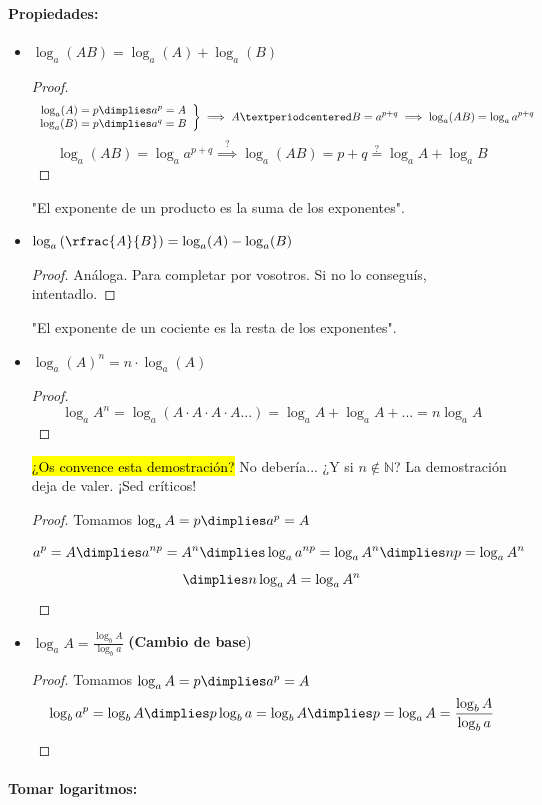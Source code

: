 \paragraph{Propiedades:}
\begin{itemize}
	\item $\log_a(AB) = \log_a(A) + \log_a(B)$
		\begin{proof}
			\[\left.\begin{array}{c}
				\log_a(A) = p \dimplies a^p = A\\
				\log_a(B) = p \dimplies a^q = B
			\end{array}\right\}\implies A·B = a^{p+q} \implies \log_a(AB) = \log_aa^{p+q}\]
			\[
				\log_a(AB) = \log_aa^{p+q} \overset{?}{\implies} \log_a(AB) = p+q \overset{?}{=} \log_aA + \log_aB
			\]
		\end{proof}
		\subitem "El exponente de un producto es la suma de los exponentes".
	\item $\log_a\left(\rfrac{A}{B}\right) = \log_a(A) - \log_a(B)$
	\begin{proof}
		Análoga. Para completar por vosotros. Si no lo conseguís, intentadlo.
	\end{proof}
	\subitem "El exponente de un cociente es la resta de los exponentes".
	\item $\log_a(A)^n = n·\log_a(A)$
	\begin{proof} 
		\[\log_aA^n = \log_a(A·A·A·A...) = \log_aA+\log_aA+... = n \log_aA\]
	\end{proof}
	\hl{¿Os convence esta demostración?} No debería... ¿Y si $n\not\in\mathbb{N}$? La demostración deja de valer. ¡Sed críticos!
	\begin{proof}
		Tomamos $\log_aA = p \dimplies a^p = A$

		\[
			a^p = A \dimplies a^{np}=A^n \dimplies \log_aa^{np} = \log_aA^n \dimplies np = \log_aA^n
		\]
		\[ 
			\dimplies n\log_aA = \log_aA^n
		\]
	\end{proof}
	\item $\displaystyle\log_aA = \frac{\log_bA}{\log_ba}$ \textbf{(Cambio de base})
		\begin{proof}
			Tomamos $\log_aA = p \dimplies a^p = A$
			\[
				\log_ba^p = \log_bA \dimplies p\log_ba = \log_bA \dimplies p=\log_aA=\frac{\log_bA}{\log_ba}
			\]

		\end{proof}
\end{itemize}

\paragraph{Tomar logaritmos:}

